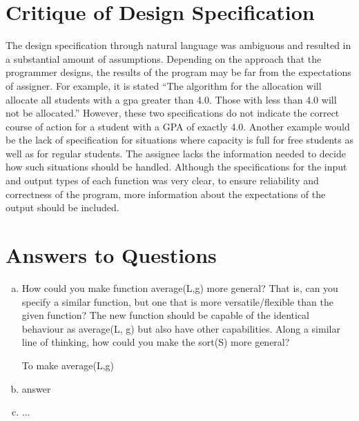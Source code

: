 \documentclass[12pt]{article}
\begin{document}
\section{Critique of Design Specification}
The design specification through natural language was ambiguous and resulted in a substantial amount of assumptions. Depending on the approach that the programmer designs, the results of the program may be far from the expectations of assigner. For example, it is stated ``The algorithm for the allocation will allocate all students with a gpa greater than 4.0. Those with less than 4.0 will not be allocated.'' However, these two specifications do not indicate the correct course of action for a student with a GPA of exactly 4.0. Another example would be the lack of specification for situations where capacity is full for free students as well as for regular students. The assignee lacks the information needed to decide how such situations should be handled. Although the specifications for the input and output types of each function was very clear, to ensure reliability and correctness of the program, more information about the expectations of the output should be included.

\section{Answers to Questions}

\begin{enumerate}[(a)]

\item How could you make function average(L,g) more general? That is, can you specify a similar function, but one that is more versatile/flexible than the given function? The new function should be capable of the identical behaviour as average(L, g) but also have other capabilities. Along a similar line of thinking, how could you make the sort(S) more general?

To make average(L,g)

\item answer

\item ...

\end{enumerate}

\newpage

\lstset{language=Python, basicstyle=\tiny, breaklines=true, showspaces=false,
  showstringspaces=false, breakatwhitespace=true}
\end{document}
